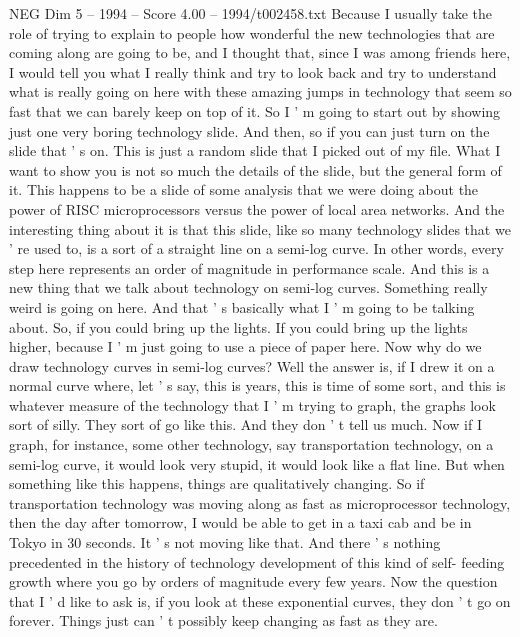 \begin{textsample}{NEG Dim 5 – 1994 – Score 4.00 – 1994/t002458.txt}  \label{ex:f5_neg_076}
Because I usually take the role of trying to explain to people how wonderful the new technologies that are coming along are going to be, and I thought that, since I was among friends here, I would tell you what I really think and try to look back and try to understand what is really going on here with these amazing jumps in technology that seem so fast that we can barely keep on top of it.
So I ' m going to start out by showing just one very boring technology slide.
And then, so if you can just turn on the slide that ' s on.
This is just a random slide that I picked out of my file.
What I want to show you is not so much the details of the slide, but the general form of it.
This happens to be a slide of some analysis that we were doing about the power of RISC microprocessors versus the power of local area networks.
And the interesting thing about it is that this slide, like so many technology slides that we ' re used to, is a sort of a straight line on a semi-log curve.
In other words, every step here represents an order of magnitude in performance scale.
And this is a new thing that we talk about technology on semi-log curves.
Something really weird is going on here.
And that ' s basically what I ' m going to be talking about.
So, if you could bring up the lights.
If you could bring up the lights higher, because I ' m just going to use a piece of paper here.
Now why do we draw technology curves in semi-log curves?
Well the answer is, if I drew it on a normal curve where, let ' s say, this is years, this is time of some sort, and this is whatever measure of the technology that I ' m trying to graph, the graphs look sort of silly.
They sort of go like this.
And they don ' t tell us much.
Now if I graph, for instance, some other technology, say transportation technology, on a semi-log curve, it would look very stupid, it would look like a flat line.
But when something like this happens, things are qualitatively changing.
So if transportation technology was moving along as fast as microprocessor technology, then the day after tomorrow, I would be able to get in a taxi cab and be in Tokyo in 30 seconds.
It ' s not moving like that.
And there ' s nothing precedented in the history of technology development of this kind of self- feeding growth where you go by orders of magnitude every few years.
Now the question that I ' d like to ask is, if you look at these exponential curves, they don ' t go on forever.
Things just can ' t possibly keep changing as fast as they are.

\end{textsample}
